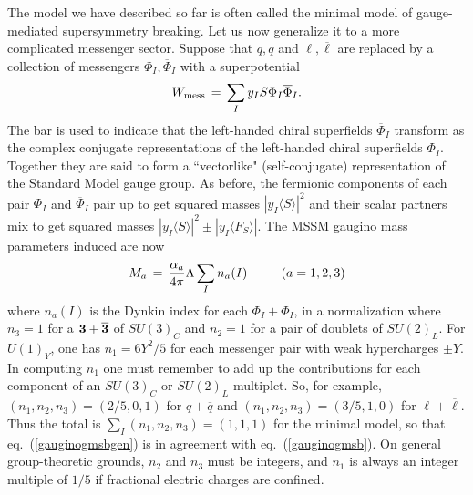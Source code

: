 \documentclass[12pt]{article}
\def\beq{\begin{eqnarray}}
\def\eeq{\end{eqnarray}}
\begin{document}
The model we have described so far is often called the minimal model of 
gauge-mediated supersymmetry breaking. Let us now generalize it to a more 
complicated messenger sector. Suppose that $q, \overline q$ and $\ell, 
\overline \ell $ are replaced by a collection of messengers 
$\Phi_I,\overline \Phi_I$ with a superpotential
\beq
W_{\rm mess} \,=\, \sum_I y_I S \Phi_I \overline \Phi_I . 
\eeq
The bar is used to indicate that the left-handed chiral superfields 
$\overline \Phi_I$ transform as the complex conjugate representations of 
the left-handed chiral superfields $\Phi_I$. Together they are said to 
form a ``vectorlike" (self-conjugate) representation of the Standard Model gauge 
group. As before, the fermionic components of each pair $\Phi_I$ and 
$\overline\Phi_I$ pair up to get squared masses $|y_I \langle S 
\rangle|^2$ and their scalar partners mix to get squared masses $|y_I 
\langle S \rangle|^2 \pm |y_I \langle F_S \rangle | $. The MSSM gaugino 
mass parameters induced are now
\beq
M_a \,=\, {\alpha_a\over 4\pi} \Lambda \sum_I n_a(I) \qquad\>\>\>(a=1,2,3)
\label{gauginogmsbgen}
\eeq
where $n_a(I)$ is the Dynkin index for each $\Phi_I+\overline \Phi_I$, in 
a normalization where $n_3 = 1$ for a ${\bf 3} + {\bf \overline 3}$ of 
$SU(3)_C$ and $n_2 = 1$ for a pair of doublets of $SU(2)_L$. For $U(1)_Y$, 
one has $n_1 = 6Y^2/5$ for each messenger pair with weak hypercharges $\pm 
Y$.  In computing $n_1$ one must remember to add up the contributions for 
each component of an $SU(3)_C$ or $SU(2)_L$ multiplet. So, for example, 
$(n_1, n_2, n_3) = (2/5, 0, 1)$ for $q+\overline q$ and $(n_1, n_2, n_3) = 
(3/5, 1, 0)$ for $\ell+\overline \ell$. Thus the total is $\sum_I (n_1, 
n_2, n_3) = (1, 1, 1)$ for the minimal model, so that 
eq.~(\ref{gauginogmsbgen}) is in agreement with eq.~(\ref{gauginogmsb}). 
On general group-theoretic grounds, $n_2$ and $n_3$ must be integers, and 
$n_1$ is always an integer multiple of $1/5$ if fractional electric 
charges are confined.
\end{document}
